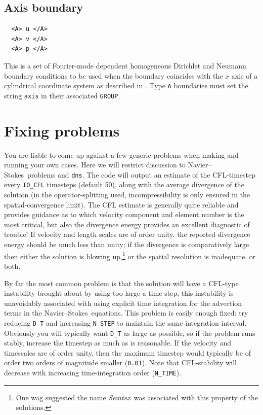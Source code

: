 \documentclass[11pt]{report}
\newcommand{\Semtex}{\emph{Semtex}} \newcommand{\Dog}{\emph{Dog}}
\newcommand\NavSto{Navier--Stokes}
\begin{document}
\subsection{Axis boundary}

{\small
\begin{verbatim}
  <A> u </A>
  <A> v </A>
  <A> p </A>
\end{verbatim}
}
\noindent
This is a set of Fourier-mode dependent homogeneous Dirichlet and
Neumann boundary conditions to be used when the boundary coincides
with the $x$ axis of a cylindrical coordinate system as described in
\citet{blsh04}. Type \verb|A| boundaries must set the string
\verb|axis| in their associated \verb|GROUP|.

\section{Fixing problems}
\label{sec.fix}

You are liable to come up against a few generic problems when making
and running your own cases. Here we will restrict discussion to
\NavSto\ problems and \verb+dns+.  The code will output an estimate of
the CFL-timestep every \verb+IO_CFL+ timesteps (default 50), along
with the average divergence of the solution (in the operator-splitting
used, incompressibility is only ensured in the spatial-convergence
limit).
%
The CFL estimate is generally quite reliable and provides guidance as
to which velocity component and element number is the most critical,
but also the divergence energy provides an excellent diagnostic of
trouble!
%
If velocity and length scales are of order unity, the reported
divergence energy should be much less than unity; if the divergence is
comparatively large then either the solution is blowing
up,\footnote{One wag suggested the name \Semtex\ was associated with
  this property of the solutions.} or the spatial resolution is
inadequate, or both.

By far the most common problem is that the solution will have a
CFL-type instability brought about by using too large a time-step;
this instability is unavoidably associated with using explicit time
integration for the advection terms in the \NavSto\ equations. This
problem is easily enough fixed: try reducing \verb+D_T+ and increasing
\verb+N_STEP+ to maintain the same integration interval. Obviously you
will typically want \verb+D_T+ as large as possible, so if the problem
runs stably, increase the timestep as much as is reasonable. If the
velocity and timescales are of order unity, then the maximum timestep
would typically be of order two orders of magnitude smaller
(\verb+0.01+). Note that CFL-stability will decrease with increasing
time-integration order (\verb+N_TIME+).
\end{document}
